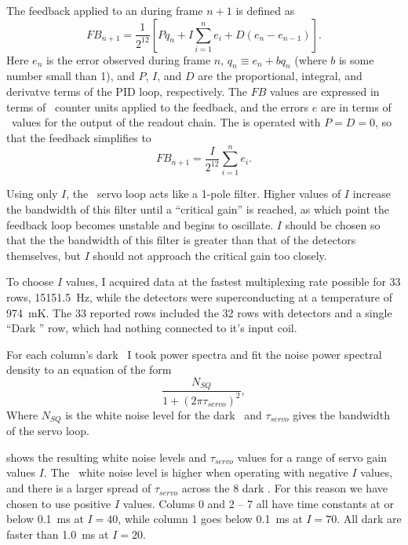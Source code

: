 The feedback applied to an  during frame $n+1$ is defined as \cite{mce_team_data_2013}
\begin{equation}
  FB_{n+1} = \frac{1}{2^{12}} \left[P q_n + I \sum_{i=1}^n e_i + D (e_n - e_{n-1}) \right].
\end{equation}
Here $e_n$ is the error observed during frame $n$, $q_n \equiv e_n + b q_n$ (where $b$ is some number small than 1), and $P$, $I$, and $D$ are the proportional, integral, and derivatve terms of the PID loop, respectively.
The $FB$ values are expressed in terms of \DAC\ counter units applied to the  feedback, and the errors $e$ are in terms of \ADC\ values for the output of the readout chain.
The \Imager is operated with $P = D = 0$, so that the feedback simplifies to
\begin{equation} \label{eqn:mce-pid-i-only}
  FB_{n+1} = \frac{I}{2^{12}} \sum_{i=1}^n e_i.
\end{equation}

Using only $I$, the \MCE\ servo loop acts like a 1-pole filter.
Higher values of $I$ increase the bandwidth of this filter until a ``critical gain'' is reached, as which point the feedback loop becomes unstable and begins to oscillate.
$I$ should be chosen so that the the bandwidth of this filter is greater than that of the detectors themselves, but $I$ should not approach the critical gain too closely.

To choose $I$ values, I acquired data at the fastest multiplexing rate possible for 33 rows, \SI{15151.5}{Hz}, while the detectors were superconducting at a temperature of \SI{974}{mK}.
The 33 reported rows included the 32 rows with detectors and a single ``Dark \SQUID'' row, which had nothing connected to it's input coil.

For each column's dark \SQUID\ I took power spectra and fit the noise power spectral density to an equation of the form
\begin{equation}
  \frac{N_{SQ}}{1 + (2 \pi \tau_{servo})^2},
\end{equation}
Where $N_{SQ}$ is the white noise level for the dark \SQUID\ and $\tau_{servo}$ gives the bandwidth of the servo loop.

 shows the resulting white noise levels and $\tau_{servo}$ values for a range of servo gain values $I$.
The \SQUID\ white noise level is higher when operating with negative $I$ values, and there is a larger spread of $\tau_{servo}$ across the 8 dark \SQUIDs.
For this reason we have chosen to use positive $I$ values.
Colums 0 and 2 -- 7 all have time constants at or below \SI{0.1}{ms} at $I = 40$, while column 1 goes below \SI{0.1}{ms} at $I = 70$.
All dark \SQUIDs are faster than \SI{1.0}{ms} at $I = 20$.

